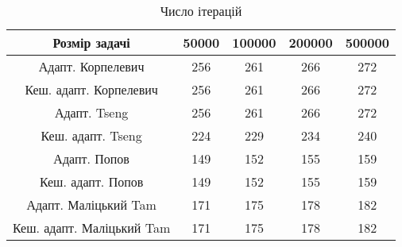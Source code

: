 \begin{table}[H]
	\centering
	\begin{tabular}{|c||c|c|c|c|}\hline
		Розмір задачі & 50000 & 100000 & 200000 & 500000 \\ \hline \hline
		Адапт. Корпелевич & 256 & 261 & 266 & 272 \\ \hline
		Кеш. адапт. Корпелевич & 256 & 261 & 266 & 272 \\ \hline
		Адапт. Tseng & 256 & 261 & 266 & 272 \\ \hline
		Кеш. адапт. Tseng & 224 & 229 & 234 & 240 \\ \hline
		Адапт. Попов & 149 & 152 & 155 & 159 \\ \hline
		Кеш. адапт. Попов & 149 & 152 & 155 & 159 \\ \hline
		Адапт. Маліцький Tam & 171 & 175 & 178 & 182 \\ \hline
		Кеш. адапт. Маліцький Tam & 171 & 175 & 178 & 182 \\ \hline
	\end{tabular}
	\caption{Число ітерацій}
\end{table}
